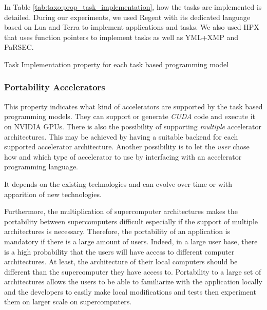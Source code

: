 In Table \ref{tab:taxo:prop_task_implementation}, how the tasks are implemented is detailed.
During our experiments, we used Regent with its dedicated language based on Lua and Terra to implement applications and tasks.
We also used HPX that uses function pointers to implement tasks as well as YML+XMP and PaRSEC.

\begin{table}[H]
	\caption{Task Implementation property for each task based programming model \label{tab:taxo:prop_task_implementation}}
	\centering
	\begin{multicols}{2}
		

		
	\end{multicols}
\end{table}

\subsubsection{Portability Accelerators}
This property indicates what kind of accelerators are supported by the task based programming models.
They can support or generate \textit{CUDA} code and execute it on NVIDIA GPUs.
There is also the possibility of supporting \textit{multiple} accelerator architectures.
This may be achieved by having a suitable backend for each supported accelerator architecture.
Another possibility is to let the \textit{user} chose how and which type of accelerator to use by interfacing with an accelerator programming language.

It depends on the existing technologies and can evolve over time or with apparition of new technologies.

Furthermore, the multiplication of supercomputer architectures makes the portability between supercomputers difficult especially if the support of multiple architectures is necessary.
Therefore, the portability of an application is mandatory if there is a large amount of users.
Indeed, in a large user base, there is a high probability that the users will have access to different computer architectures.
At least, the architecture of their local computers should be different than the supercomputer they have access to.
Portability to a large set of architectures allows the users to be able to familiarize with the application locally and the developers to easily make local modifications and tests then experiment them on larger scale on supercomputers.

